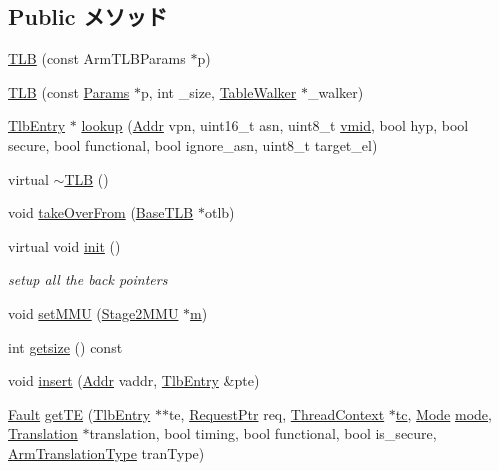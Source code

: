 \subsection*{Public メソッド}
\begin{DoxyCompactItemize}
\item 
\hyperlink{classArmISA_1_1TLB_a072a0e1c517c70f5baf23c7bf1aae5c6}{TLB} (const ArmTLBParams $\ast$p)
\item 
\hyperlink{classArmISA_1_1TLB_a5bc074f4c969287561515e7906f422b5}{TLB} (const \hyperlink{classSimObject_a0f0761d2db586a23bb2a2880b8f387bb}{Params} $\ast$p, int \_\-size, \hyperlink{classArmISA_1_1TableWalker}{TableWalker} $\ast$\_\-walker)
\item 
\hyperlink{structArmISA_1_1TlbEntry}{TlbEntry} $\ast$ \hyperlink{classArmISA_1_1TLB_a16c4d359f56a027d2e6afe6af85c81e4}{lookup} (\hyperlink{classm5_1_1params_1_1Addr}{Addr} vpn, uint16\_\-t asn, uint8\_\-t \hyperlink{classArmISA_1_1TLB_add293169f7f2ac526b3fa14f950cf0bb}{vmid}, bool hyp, bool secure, bool functional, bool ignore\_\-asn, uint8\_\-t target\_\-el)
\item 
virtual \hyperlink{classArmISA_1_1TLB_a18a1722ab7889997b15fd7b9fc33c7ff}{$\sim$TLB} ()
\item 
void \hyperlink{classArmISA_1_1TLB_a15b6c15c1be2ca4de3e65772a02aa29f}{takeOverFrom} (\hyperlink{classBaseTLB}{BaseTLB} $\ast$otlb)
\item 
virtual void \hyperlink{classArmISA_1_1TLB_a02fd73d861ef2e4aabb38c0c9ff82947}{init} ()
\begin{DoxyCompactList}\small\item\em setup all the back pointers \item\end{DoxyCompactList}\item 
void \hyperlink{classArmISA_1_1TLB_ae888fc9d1a9bad8784469601dcf8d436}{setMMU} (\hyperlink{classArmISA_1_1Stage2MMU}{Stage2MMU} $\ast$\hyperlink{namespaceArmISA_afb747b54d0c5e3e4e1763be19ca9373b}{m})
\item 
int \hyperlink{classArmISA_1_1TLB_ae121404a6cfcf714e05fe2231ce4c7fc}{getsize} () const 
\item 
void \hyperlink{classArmISA_1_1TLB_a0a32b96ef1142ca48fa347d06b5d2436}{insert} (\hyperlink{classm5_1_1params_1_1Addr}{Addr} vaddr, \hyperlink{structArmISA_1_1TlbEntry}{TlbEntry} \&pte)
\item 
\hyperlink{classRefCountingPtr}{Fault} \hyperlink{classArmISA_1_1TLB_acdb1ef6fa70ed231ff084dced51b91eb}{getTE} (\hyperlink{structArmISA_1_1TlbEntry}{TlbEntry} $\ast$$\ast$te, \hyperlink{classRequest}{RequestPtr} req, \hyperlink{classThreadContext}{ThreadContext} $\ast$\hyperlink{namespaceArmISA_a5aff829af55e65b802d83dfcef4e9dd0}{tc}, \hyperlink{classBaseTLB_a46c8a310cf4c094f8c80e1cb8dc1f911}{Mode} \hyperlink{namespaceArmISA_a5f3b9b97eb2dfa29d33e74878455f90d}{mode}, \hyperlink{classBaseTLB_1_1Translation}{Translation} $\ast$translation, bool timing, bool functional, bool is\_\-secure, \hyperlink{classArmISA_1_1TLB_ad6f5d480df151d5bddeefc6271793f08}{ArmTranslationType} tranType)
$$
\end{DoxyCompactItemize}
